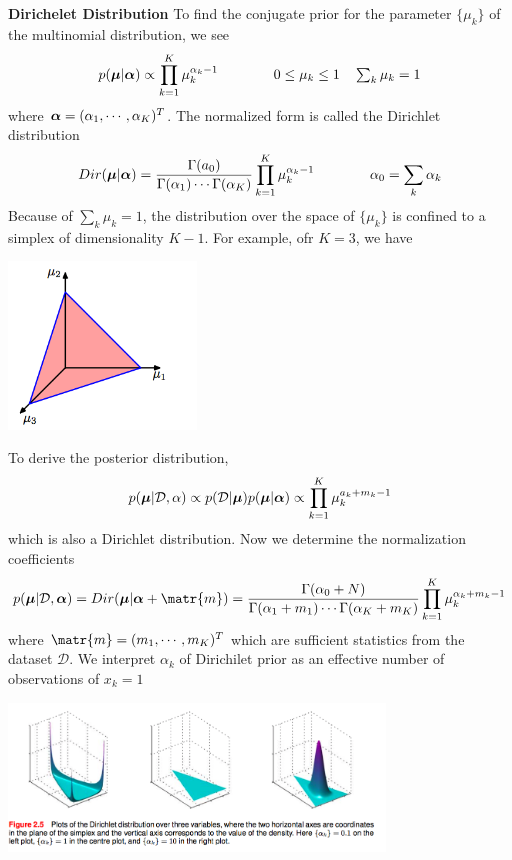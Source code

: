\documentclass[11pt]{article}
\begin{document}
\begin{defn*}
    \textbf{Dirichelet Distribution} To find the conjugate prior for the parameter $\{\mu_k\}$ of the multinomial distribution, we see 
    \[
        p(\boldsymbol{\mu} | \boldsymbol{\alpha})
        \propto \prod_{k=1}^K \mu_k^{\alpha_k - 1}
        \quad \quad \quad \quad 
        0 \leq \mu_k \leq 1 \quad 
        \textstyle \sum_k \mu_k=1
    \]
    where $\boldsymbol{\alpha} = (\alpha_1, \cdots, \alpha_K)^T$. The normalized form is called the Dirichlet distribution 
    \[
        Dir(\boldsymbol{\mu} | \boldsymbol{\alpha}) = \frac{\Gamma(a_0)}{\Gamma(\alpha_1) \cdots \Gamma(\alpha_K)} \prod_{k=1}^K \mu_k^{\alpha_k - 1}
        \quad \quad \quad \quad 
        \alpha_0 = \sum_k \alpha_k
    \]
    Because of $\textstyle \sum_k \mu_k = 1$, the distribution over the space of $\{\mu_k\}$ is confined to a simplex of dimensionality $K-1$. For example, ofr $K=3$, we have \\
    \begin{center}
        \includegraphics[width=5cm]{dirichlet_simplex.jpg}
    \end{center}
    To derive the posterior distribution, 
    \[
        p(\boldsymbol{\mu}|\mathcal{D}, \alpha) \propto p(\mathcal{D}|\boldsymbol{\mu})p(\boldsymbol{\mu}|\boldsymbol{\alpha})
        \propto \prod_{k=1}^K \mu_k^{a_k+m_k-1}    
    \]
    which is also a Dirichlet distribution. Now we determine the normalization coefficients 
    \[
        p(\bmu|\mathcal{D},\balpha) = Dir(\bmu|\balpha + \matr{m}) 
        = \frac{\Gamma(\alpha_0 + N)}{\Gamma(\alpha_1 + m_1) \cdots \Gamma(\alpha_K + m_K)} \prod_{k=1}^K \mu_k^{\alpha_k + m_k - 1}
    \]
    where $\matr{m} = (m_1, \cdots, m_K)^T$ which are sufficient statistics from the dataset $\mathcal{D}$. We interpret $\alpha_k$ of Dirichilet prior as an effective number of observations of $x_k=1$ 
    \begin{center} 
        \includegraphics[width=10cm]{dirichlet.jpg}
    \end{center}
\end{defn*}
\end{document}
